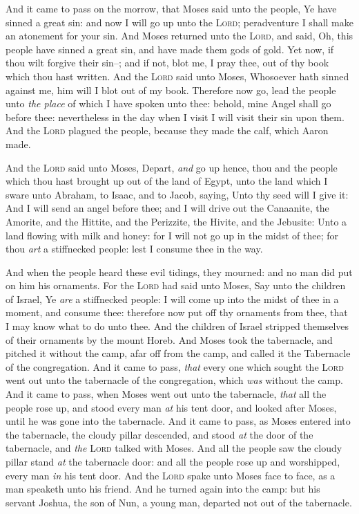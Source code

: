 \documentclass[11pt,letterpaper,oneside]{memoir}
\begin{document}
And it came to pass on the morrow, that Moses said unto the people, Ye
have sinned a great sin: and now I will go up unto the \textsc{Lord};
peradventure I shall make an atonement for your sin. And Moses returned
unto the \textsc{Lord}, and said, Oh, this people have sinned a great
sin, and have made them gods of gold. Yet now, if thou wilt forgive
their sin--; and if not, blot me, I pray thee, out of thy book which
thou hast written. And the \textsc{Lord} said unto Moses, Whosoever hath
sinned against me, him will I blot out of my book. Therefore now go,
lead the people unto \emph{the place} of which I have spoken unto thee:
behold, mine Angel shall go before thee: nevertheless in the day when I
visit I will visit their sin upon them. And the \textsc{Lord} plagued
the people, because they made the calf, which Aaron made.

And the \textsc{Lord} said unto Moses, Depart, \emph{and} go up hence,
thou and the people which thou hast brought up out of the land of Egypt,
unto the land which I sware unto Abraham, to Isaac, and to Jacob,
saying, Unto thy seed will I give it: And I will send an angel before
thee; and I will drive out the Canaanite, the Amorite, and the Hittite,
and the Perizzite, the Hivite, and the Jebusite: Unto a land flowing
with milk and honey: for I will not go up in the midst of thee; for thou
\emph{art} a stiffnecked people: lest I consume thee in the way.

And when the people heard these evil tidings, they mourned: and no man
did put on him his ornaments. For the \textsc{Lord} had said unto Moses,
Say unto the children of Israel, Ye \emph{are} a stiffnecked people: I
will come up into the midst of thee in a moment, and consume thee:
therefore now put off thy ornaments from thee, that I may know what to
do unto thee. And the children of Israel stripped themselves of their
ornaments by the mount Horeb. And Moses took the tabernacle, and pitched
it without the camp, afar off from the camp, and called it the
Tabernacle of the congregation. And it came to pass, \emph{that} every
one which sought the \textsc{Lord} went out unto the tabernacle of the
congregation, which \emph{was} without the camp. And it came to pass,
when Moses went out unto the tabernacle, \emph{that} all the people rose
up, and stood every man \emph{at} his tent door, and looked after Moses,
until he was gone into the tabernacle. And it came to pass, as Moses
entered into the tabernacle, the cloudy pillar descended, and stood
\emph{at} the door of the tabernacle, and \emph{the} \textsc{Lord}
talked with Moses. And all the people saw the cloudy pillar stand
\emph{at} the tabernacle door: and all the people rose up and
worshipped, every man \emph{in} his tent door. And the \textsc{Lord}
spake unto Moses face to face, as a man speaketh unto his friend. And he
turned again into the camp: but his servant Joshua, the son of Nun, a
young man, departed not out of the tabernacle.
\end{document}
